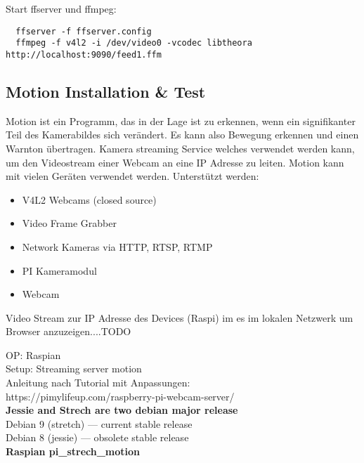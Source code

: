 Start ffserver und ffmpeg:
\begin{verbatim}
  ffserver -f ffserver.config
  ffmpeg -f v4l2 -i /dev/video0 -vcodec libtheora http://localhost:9090/feed1.ffm
\end{verbatim}

\subsection{Motion Installation \& Test}

Motion ist ein Programm, das in der Lage ist zu erkennen, wenn ein signifikanter Teil des Kamerabildes sich verändert. Es kann also Bewegung erkennen und einen Warnton übertragen. Kamera streaming Service welches verwendet werden kann, um den Videostream einer Webcam an eine IP Adresse zu leiten. Motion kann mit vielen Geräten verwendet werden. Unterstützt werden:
\begin{itemize}
\item V4L2 Webcams (closed source)
\item Video Frame Grabber
\item Network Kameras via HTTP, RTSP, RTMP
\item PI Kameramodul
\item Webcam
\end{itemize}

Video Stream zur IP Adresse des Devices (Raspi) im es im lokalen 
Netzwerk um Browser anzuzeigen....TODO

OP: Raspian\\
Setup: Streaming server motion\\

Anleitung nach Tutorial mit Anpassungen:\\
https://pimylifeup.com/raspberry-pi-webcam-server/\\

\textbf{Jessie and Strech are two debian major release}\\
Debian 9 (stretch) — current stable release\\
Debian 8 (jessie) — obsolete stable release\\

\textbf{Raspian pi\_strech\_motion}

